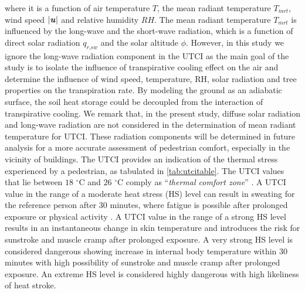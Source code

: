 where it is a function of air temperature $T$, the mean radiant temperature $T_{\textit{mrt}}$, wind speed $|\textbf{\textit{u}}|$ and relative humidity $RH$. The mean radiant temperature $T_{\textit{mrt}}$ is influenced by the long-wave and the short-wave radiation, which is a function of direct solar radiation $q_{\textit{r,sw}}$ and the solar altitude $\phi$. However, in this study we ignore the long-wave radiation component in the UTCI as the main goal of the study is to isolate the influence of transpirative cooling effect on the air and determine the influence of wind speed, temperature, RH, solar radiation and tree properties on the transpiration rate. By modeling the ground as an adiabatic surface, the soil heat storage could be decoupled from the interaction of transpirative cooling. We remark that, in the present study, diffuse solar radiation and long-wave radiation are not considered in the determination of mean radiant temperature for UTCI. These radiation components will be determined in future analysis for a more accurate assessment of pedestrian comfort, especially in the vicinity of buildings. The UTCI provides an indication of the thermal stress experienced by a pedestrian, as tabulated in \cref{tab:utcitable}. The UTCI values that lie between $18$ $^{\circ}$C and $26$ $^{\circ}$C comply as “\textit{thermal comfort zone}” \citep{Marshall1987}. A UTCI value in the range of a moderate heat stress (HS) level can result in sweating for the reference person after 30 minutes, where fatigue is possible after prolonged exposure or physical activity \citep{Blazejczyk2012,Bazejczyk2013}. A UTCI value in the range of a strong HS level results in an instantaneous change in skin temperature and introduces the risk for sunstroke and muscle cramp after prolonged exposure. A very strong HS level is considered dangerous showing increase in internal body temperature within 30 minutes with high possibility of sunstroke and muscle cramp after prolonged exposure. An extreme HS level is considered highly dangerous with high likeliness of heat stroke.

